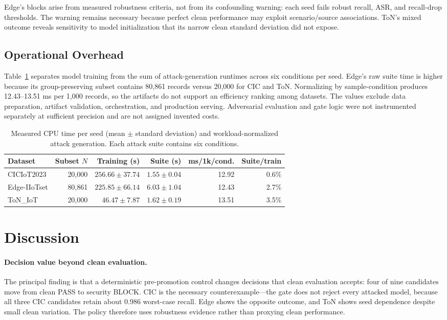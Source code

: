 \documentclass[runningheads]{llncs}
\begin{document}
Edge's blocks arise from measured robustness criteria, not from its confounding warning: each seed fails robust recall, ASR, and recall-drop thresholds. The warning remains necessary because perfect clean performance may exploit scenario/source associations. ToN's mixed outcome reveals sensitivity to model initialization that its narrow clean standard deviation did not expose.

\subsection{Operational Overhead}
Table~\ref{tab:time} separates model training from the sum of attack-generation runtimes across six conditions per seed. Edge's raw suite time is higher because its group-preserving subset contains 80,861 records versus 20,000 for CIC and ToN. Normalizing by sample-condition produces 12.43--13.51 ms per 1,000 records, so the artifacts do not support an efficiency ranking among datasets. The values exclude data preparation, artifact validation, orchestration, and production serving. Adversarial evaluation and gate logic were not instrumented separately at sufficient precision and are not assigned invented costs.

\begin{table}[t]
\caption{Measured CPU time per seed (mean $\pm$ standard deviation) and workload-normalized attack generation. Each attack suite contains six conditions.}
\label{tab:time}
\centering\small
\setlength{\tabcolsep}{3.5pt}
\begin{tabular}{lrrrrr}
\toprule
Dataset & Subset $N$ & Training (s) & Suite (s) & ms/1k/cond. & Suite/train\\
\midrule
CICIoT2023 & 20,000 & $256.66\pm37.74$ & $1.55\pm0.04$ & 12.92 & 0.6\%\\
Edge-IIoTset & 80,861 & $225.85\pm66.14$ & $6.03\pm1.04$ & 12.43 & 2.7\%\\
ToN\_IoT & 20,000 & $46.47\pm7.87$ & $1.62\pm0.19$ & 13.51 & 3.5\%\\
\bottomrule
\end{tabular}
\end{table}

\section{Discussion}
\paragraph{Decision value beyond clean evaluation.}
The principal finding is that a deterministic pre-promotion control changes decisions that clean evaluation accepts: four of nine candidates move from clean PASS to security BLOCK. CIC is the necessary counterexample---the gate does not reject every attacked model, because all three CIC candidates retain about 0.986 worst-case recall. Edge shows the opposite outcome, and ToN shows seed dependence despite small clean variation. The policy therefore uses robustness evidence rather than proxying clean performance.
\end{document}
